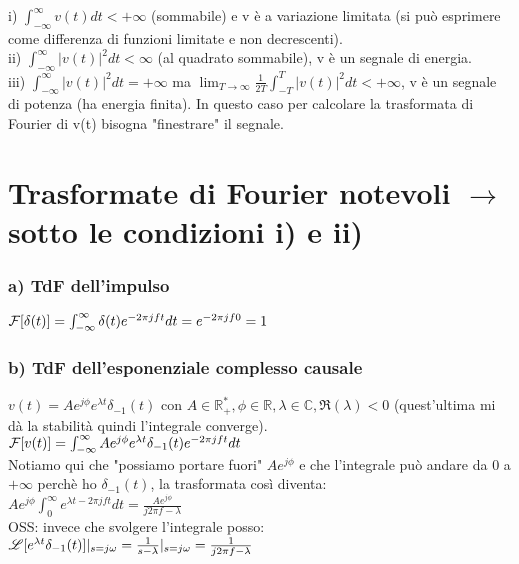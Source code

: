 	i) $ \int_{- \infty}^{ \infty} v(t) dt < +\infty$ (sommabile) e v è a variazione limitata (si può esprimere come differenza di funzioni limitate e non decrescenti).\\
	
	ii) $ \int_{- \infty}^{ \infty} |v(t)|^2 dt < \infty$ (al quadrato sommabile), v è un segnale di energia.\\
	
	iii) $ \int_{- \infty}^{ \infty} |v(t)|^2 dt = +\infty$ ma $ \lim_{T \to \infty} \frac{1}{2T}   \int_{- T}^{ T} |v(t)|^2 dt < +\infty $, v è un segnale di potenza (ha energia finita). In questo caso per calcolare la trasformata di Fourier di v(t) bisogna "finestrare" il segnale.\\
	
\section{Trasformate di Fourier notevoli $ \rightarrow $ sotto le condizioni i) e ii) }
	
	\subsubsection{a) TdF dell'impulso}
	
	$ \mathcal{F} [ \delta(t) ] = \int_{- \infty}^{ \infty} \delta (t) e^{-2 \pi j f t} dt = e^{-2 \pi j f  0} = 1 $\\
	
	
	\subsubsection{b) TdF dell'esponenziale complesso causale}
	
	$ v(t) = A e^{ j \phi} e^{ \lambda t} \delta_{-1}(t) $ con $ A \in \mathbb{R}^*_+, \phi \in \mathbb{R}, \lambda \in \mathbb{C}, \Re (\lambda ) < 0 $ (quest'ultima mi dà la stabilità quindi l'integrale converge).\\
	
	$ \mathcal{F} [ v(t) ] = \int_{- \infty}^{ \infty} A e^{ j \phi} e^{ \lambda t} \delta_{-1}(t) e^{-2 \pi jft} dt $\\
	Notiamo qui che "possiamo portare fuori" $ A e^{ j \phi} $ e che l'integrale può andare da 0 a $ + \infty$ perchè ho $\delta_{-1}(t) $, la trasformata così diventa:\\
	$ A e^{ j \phi} \int_{ 0 }^{ \infty}  e^{ \lambda t -2 \pi jft} dt = \frac{A e^{j \phi}}{j2 \pi f - \lambda} $\\
	OSS: invece che svolgere l'integrale posso:\\
	$ \mathscr{L} [ e^{\lambda t} \delta_{-1}(t)] |_{s=j \omega} = \frac{1}{s-\lambda} |_{s=j \omega} = \frac{1}{j2 \pi f-\lambda}$
	
